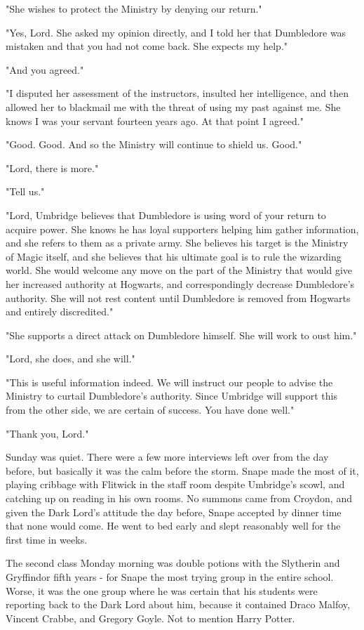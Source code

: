 "She wishes to protect the Ministry by denying our return."

"Yes, Lord. She asked my opinion directly, and I told her that Dumbledore was mistaken and that you had not come back. She expects my help."

"And you agreed."

"I disputed her assessment of the instructors, insulted her intelligence, and then allowed her to blackmail me with the threat of using my past against me. She knows I was your servant fourteen years ago. At that point I agreed."

"Good. Good. And so the Ministry will continue to shield us. Good."

"Lord, there is more."

"Tell us."

"Lord, Umbridge believes that Dumbledore is using word of your return to acquire power. She knows he has loyal supporters helping him gather information, and she refers to them as a private army. She believes his target is the Ministry of Magic itself, and she believes that his ultimate goal is to rule the wizarding world. She would welcome any move on the part of the Ministry that would give her increased authority at Hogwarts, and correspondingly decrease Dumbledore's authority. She will not rest content until Dumbledore is removed from Hogwarts and entirely discredited."

"She supports a direct attack on Dumbledore himself. She will work to oust him."

"Lord, she does, and she will."

"This is useful information indeed. We will instruct our people to advise the Ministry to curtail Dumbledore's authority. Since Umbridge will support this from the other side, we are certain of success. You have done well."

"Thank you, Lord."

Sunday was quiet. There were a few more interviews left over from the day before, but basically it was the calm before the storm. Snape made the most of it, playing cribbage with Flitwick in the staff room despite Umbridge's scowl, and catching up on reading in his own rooms. No summons came from Croydon, and given the Dark Lord's attitude the day before, Snape accepted by dinner time that none would come. He went to bed early and slept reasonably well for the first time in weeks.

The second class Monday morning was double potions with the Slytherin and Gryffindor fifth years - for Snape the most trying group in the entire school. Worse, it was the one group where he was certain that his students were reporting back to the Dark Lord about him, because it contained Draco Malfoy, Vincent Crabbe, and Gregory Goyle. Not to mention Harry Potter.

